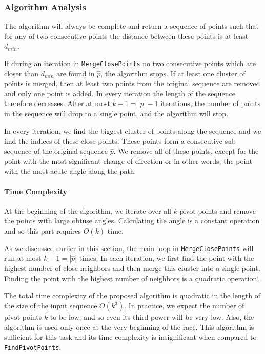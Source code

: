\subsubsection{Algorithm Analysis}

The algorithm will always be complete and return a sequence of points such that for any of two consecutive points the distance between these points is at least $d_{min}$. 

If during an iteration in \texttt{MergeClosePoints} no two consecutive points which are closer than $d_{min}$ are found in $\hat{p}$, the algorithm stops. If at least one cluster of points is merged, then at least two points from the original sequence are removed and only one point is added. In every iteration the length of the sequence therefore decreases. After at most $k-1=|\hat{p}|-1$ iterations, the number of points in the sequence will drop to a single point, and the algorithm will stop.

In every iteration, we find the biggest cluster of points along the sequence and we find the indices of these close points. These points form a consecutive sub-sequence of the original sequence $\hat{p}$. We remove all of these points, except for the point with the most significant change of direction or in other words, the point with the most acute angle along the path.

\paragraph{Time Complexity}

At the beginning of the algorithm, we iterate over all $k$ pivot points and remove the points with large obtuse angles. Calculating the angle is a constant operation and so this part requires $O(k)$ time.

As we discussed earlier in this section, the main loop in \texttt{MergeClosePoints} will run at most $k-1=|\hat{p}|$ times. In each iteration, we first find the point with the highest number of close neighbors and then merge this cluster into a single point. Finding the point with the highest number of neighbors is a quadratic operation`.

The total time complexity of the proposed algorithm is quadratic in the length of the size of the input sequence $O(k^3)$. In practice, we expect the number of pivot points $k$ to be low, and so even its third power will be very low. Also, the algorithm is used only once at the very beginning of the race. This algorithm is sufficient for this task and its time complexity is insignificant when compared to \texttt{FindPivotPoints}.


